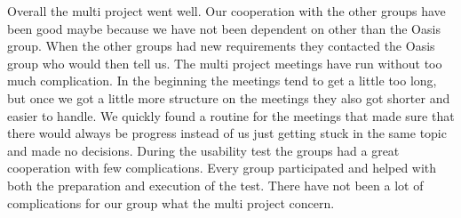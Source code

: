 Overall the multi project went well. Our cooperation with the other groups have been good maybe because we have not been dependent on other than the Oasis group. When the other groups had new requirements they contacted the Oasis group who would then tell us. 
The multi project meetings have run without too much complication. In the beginning the meetings tend to get a little too long, but once we got a little more structure on the meetings they also got shorter and easier to handle. We quickly found a routine for the meetings that made sure that there would always be progress instead of us just getting stuck in the same topic and made no decisions. 
During the usability test the groups had a great cooperation with few complications. Every group participated and helped with both the preparation and execution of the test. 
There have not been a lot of complications for our group what the multi project concern.